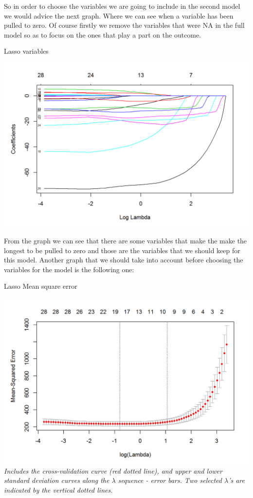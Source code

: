 \documentclass{book}
\begin{document}
So in order to choose the variables we are going to include in the second model we would advice the next graph. Where we can see when a variable has been pulled to zero. Of course firstly we remove the variables that were NA in the full model so as to focus on the ones that play a part on the outcome. 
\begin{table}[H]
\centering
\caption{Lasso variables}
\begin{center}
\includegraphics[scale=0.5]{../R/photos/70_lasso.png}   \\
\end{center}
\end{table}
From the graph we can see that there are some variables that make the make the longest to be pulled to zero and those are the variables that we should keep for this model.
Another graph that we should take into account before choosing the variables for the model is the following one:
\begin{table}[H]
\centering
\caption{Lasso Mean square error}
\begin{center}
\includegraphics[scale=0.6]{../R/photos/71_lassob.png}    \\
\textit{Includes the cross-validation curve (red dotted line), and upper and lower standard deviation curves along the $\lambda$ sequence - error bars. Two selected $\lambda$’s are indicated by the vertical dotted lines.}
\end{center}
\end{table}
\end{document}
